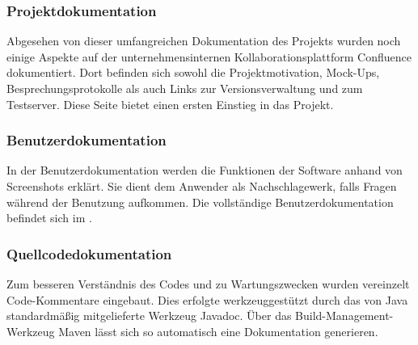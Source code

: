\subsubsection{Projektdokumentation}
\label{sec:Projektdokumentation}
Abgesehen von dieser umfangreichen Dokumentation des Projekts wurden noch einige Aspekte auf der unternehmensinternen Kollaborationsplattform Confluence dokumentiert. Dort befinden sich sowohl die Projektmotivation, Mock-Ups, Besprechungsprotokolle als auch Links zur Versionsverwaltung und zum Testserver. Diese Seite bietet einen ersten Einstieg in das Projekt.

\subsubsection{Benutzerdokumentation}
\label{sec:Benutzerdokumentation}
In der Benutzerdokumentation werden die Funktionen der Software anhand von Screenshots erklärt. Sie dient dem Anwender als Nachschlagewerk, falls Fragen während der Benutzung aufkommen. Die vollständige Benutzerdokumentation befindet sich im .

\subsubsection{Quellcodedokumentation}
\label{sec:Quellcodedokumentation}
Zum besseren Verständnis des Codes und zu Wartungszwecken wurden vereinzelt Code-Kom\-men\-tare eingebaut. Dies erfolgte werkzeuggestützt durch das von Java standardmäßig mitgelieferte Werkzeug Javadoc. Über das Build-Management-Werkzeug Maven lässt sich so automatisch eine Dokumentation generieren.


\newpage